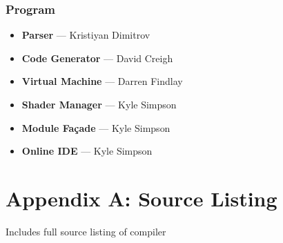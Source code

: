 \documentclass{l3proj}
\begin{document}
\subsection{Program}
\label{cont-prog}
\begin{itemize}
\item \textbf{Parser} --- Kristiyan Dimitrov
\item \textbf{Code Generator} --- David Creigh
\item \textbf{Virtual Machine} --- Darren Findlay
\item \textbf{Shader Manager} --- Kyle Simpson
\item \textbf{Module Fa\c{c}ade} --- Kyle Simpson
\item \textbf{Online IDE} --- Kyle Simpson
\end{itemize}

\appendix
\chapter{Appendix A: Source Listing}
\label{appa}

Includes full source listing of compiler



\end{document}
